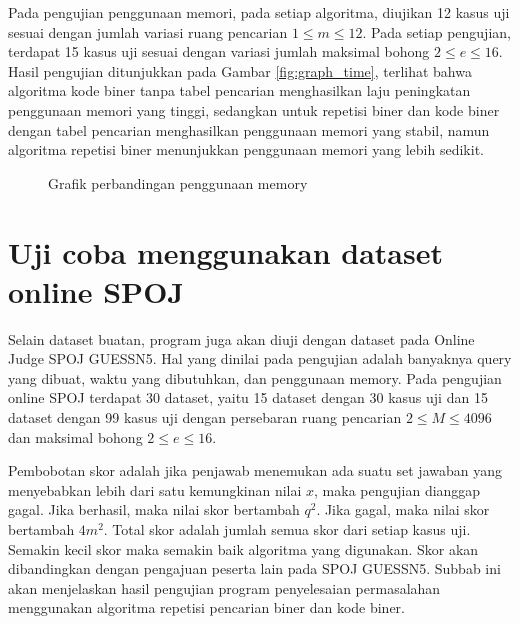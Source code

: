 Pada pengujian penggunaan memori, pada setiap algoritma, diujikan 12 kasus uji sesuai dengan jumlah variasi ruang pencarian $1 \leq m \leq 12$. Pada setiap pengujian, terdapat 15 kasus uji sesuai dengan variasi jumlah maksimal bohong $2 \leq e \leq 16$. Hasil pengujian ditunjukkan pada Gambar \ref{fig:graph_time}, terlihat bahwa algoritma kode biner tanpa tabel pencarian menghasilkan laju peningkatan penggunaan memori yang tinggi, sedangkan untuk repetisi biner dan kode biner dengan tabel pencarian menghasilkan penggunaan memori yang stabil, namun algoritma repetisi biner menunjukkan penggunaan memori yang lebih sedikit.

\begin{figure}
\centering
{}
\caption{Grafik perbandingan penggunaan memory}
\label{fig:graph_memory}
\end{figure}

\section{Uji coba menggunakan dataset online SPOJ}

Selain dataset buatan, program juga akan diuji dengan dataset pada Online Judge SPOJ GUESSN5. Hal yang dinilai pada pengujian adalah banyaknya query yang dibuat, waktu yang dibutuhkan, dan penggunaan memory. Pada pengujian online SPOJ terdapat 30 dataset, yaitu 15 dataset dengan 30 kasus uji dan 15 dataset dengan 99 kasus uji dengan persebaran ruang pencarian $2 \leq M \leq 4096$ dan maksimal bohong $2 \leq e \leq 16$.

Pembobotan skor adalah jika penjawab menemukan ada suatu set jawaban yang menyebabkan lebih dari satu kemungkinan nilai $x$, maka pengujian dianggap gagal. Jika berhasil, maka nilai skor bertambah $q^2$. Jika gagal, maka nilai skor bertambah $4m^2$. Total skor adalah jumlah semua skor dari setiap kasus uji. Semakin kecil skor maka semakin baik algoritma yang digunakan. Skor akan dibandingkan dengan pengajuan peserta lain pada SPOJ GUESSN5. Subbab ini akan menjelaskan hasil pengujian program penyelesaian permasalahan menggunakan algoritma repetisi pencarian biner dan kode biner.

